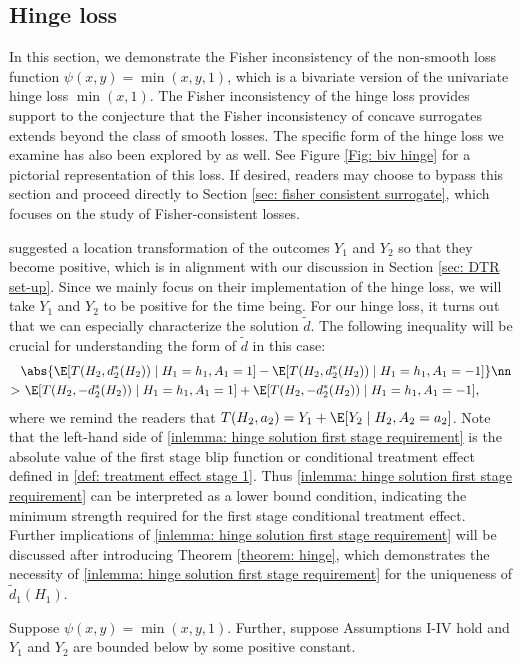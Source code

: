 \documentclass[preprint] {imsart}
\begin{document}
 \subsection{Hinge loss}
 \label{sec: hinge loss}
{\color{black} In this section, we demonstrate the Fisher inconsistency of the non-smooth loss function $\psi(x,y)=\min(x,y,1)$, which is a bivariate version of the univariate hinge loss $\min(x,1)$.   The Fisher inconsistency of the hinge loss provides support to the conjecture that the Fisher inconsistency of concave surrogates extends beyond the class of smooth losses. The specific form of the hinge loss we examine has also been explored by \cite{zhao2015} as well. See Figure \ref{Fig: biv hinge} for a pictorial representation of this loss.   If desired, readers may choose to bypass this section and proceed directly to Section \ref{sec: fisher consistent surrogate}, which focuses on the study of Fisher-consistent losses.

 \cite{zhao2015} suggested a location transformation of the outcomes  $Y_1$ and $Y_2$ so that they become positive, which is in alignment with our discussion in Section \ref{sec: DTR set-up}. Since we mainly focus on their implementation of the hinge loss, we will take $Y_1$ and $Y_2$ to be positive for the time being.
     For our hinge loss, it turns out that we can especially characterize the solution $\tilde d$. The following inequality will be crucial for understanding the form of $\tilde d$ in this case: 
\begin{align}
 \label{inlemma: hinge solution first stage requirement}
 & \abs{\E[T(H_2,d_2^*(H_2))\mid H_1=h_1,A_1=1]-\E[T(H_2,d_2^*(H_2))\mid H_1=h_1,A_1=-1] }\nn\\
> &\ \E[T(H_2,-d_2^*(H_2))\mid H_1=h_1,A_1=1] +\E[T(H_2,-d_2^*(H_2))\mid H_1=h_1,A_1=-1],
\end{align}
where we remind the readers that $T(H_2, a_2)=Y_1+ \E[Y_2\mid H_2, A_2=a_2]$. Note that the left-hand side of \eqref{inlemma: hinge solution first stage requirement} is the absolute value of the first stage blip function or conditional treatment effect defined in \eqref{def: treatment effect stage 1}. Thus \eqref{inlemma: hinge solution first stage requirement} can be interpreted as a lower bound condition, indicating the minimum strength required for the first stage conditional treatment effect. Further implications of \eqref{inlemma: hinge solution first stage requirement} will be discussed after introducing Theorem \ref{theorem: hinge}, which demonstrates the necessity of  \eqref{inlemma: hinge solution first stage requirement} for the uniqueness of $\tilde d_1(H_1)$.
\begin{theorem}
 \label{theorem: hinge}
  Suppose $\psi(x,y)=\min(x,y,1)$. Further, suppose Assumptions I-IV hold and  $Y_1$ and $Y_2$ are bounded below by some positive constant.
 

\end{theorem}}
\end{document}
